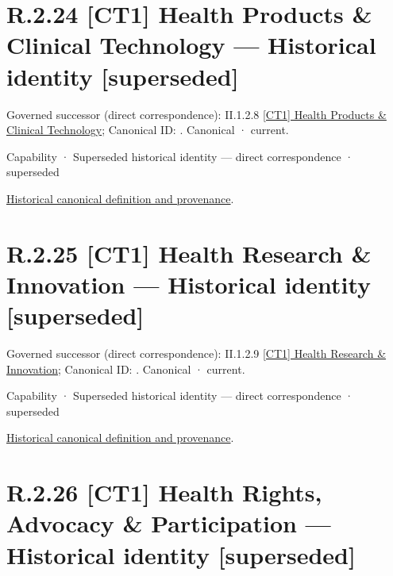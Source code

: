 \section*{R.2.24 [CT1] Health Products \& Clinical Technology — Historical identity [superseded]}
\label{navigation:R.2.24}

{\small Governed successor (direct correspondence): II.1.2.8 \hyperref[element:54388e3202c2403089b5c476c78c4567]{[CT1] Health Products \& Clinical Technology}; Canonical ID: \texttt{}. Canonical · current.}\par
\label{element:a631a8600b8b49df9ef452c48c91349a}
{\small Capability · Superseded historical identity — direct correspondence · superseded}\par
\href{../../../../../../../continuum/strategy/capability/a631a8600b8b49df9ef452c48c91349a.md}{Historical canonical definition and provenance}.\par
\section*{R.2.25 [CT1] Health Research \& Innovation — Historical identity [superseded]}
\label{navigation:R.2.25}

{\small Governed successor (direct correspondence): II.1.2.9 \hyperref[element:582bf62145fd42118e5d57bb714841e8]{[CT1] Health Research \& Innovation}; Canonical ID: \texttt{}. Canonical · current.}\par
\label{element:2cc31384c8864c73989025cbe96dcfa7}
{\small Capability · Superseded historical identity — direct correspondence · superseded}\par
\href{../../../../../../../continuum/strategy/capability/2cc31384c8864c73989025cbe96dcfa7.md}{Historical canonical definition and provenance}.\par
\section*{R.2.26 [CT1] Health Rights, Advocacy \& Participation — Historical identity [superseded]}
\label{navigation:R.2.26}

